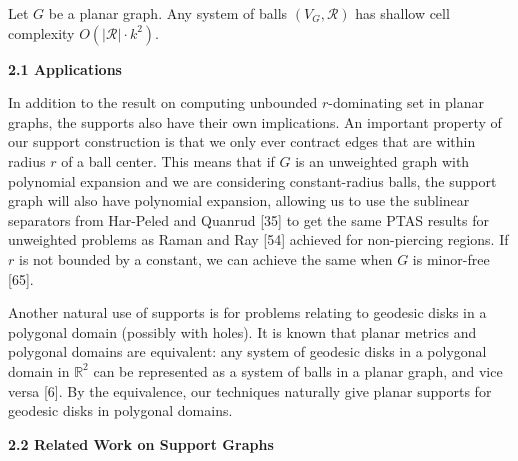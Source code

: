 \documentclass[10pt,a4paper]{article}
\begin{document}
Let $G$ be a planar graph. Any system of balls $(V_{G},\mathcal{R})$ has shallow cell complexity $O(|\mathcal{R}|\cdot k^{2})$.
\par
\par
\par
\par\medskip\noindent\textbf{2.1 Applications}\par
In addition to the result on computing unbounded $r$-dominating set in planar graphs, the supports also have their own implications. An important property of our support construction is that we only ever contract edges that are within radius $r$ of a ball center. This means that if $G$ is an unweighted graph with polynomial expansion and we are considering constant-radius balls, the support graph will also have polynomial expansion, allowing us to use the sublinear separators from Har-Peled and Quanrud [35] to get the same PTAS results for unweighted problems as Raman and Ray [54] achieved for non-piercing regions. If $r$ is not bounded by a constant, we can achieve the same when $G$ is minor-free [65].
\par
\par
Another natural use of supports is for problems relating to geodesic disks in a polygonal domain (possibly with holes). It is known that planar metrics and polygonal domains are equivalent: any system of geodesic disks in a polygonal domain in $\mathbb{R}^{2}$ can be represented as a system of balls in a planar graph, and vice versa [6]. By the equivalence, our techniques naturally give planar supports for geodesic disks in polygonal domains.
\par
\par
\par\medskip\noindent\textbf{2.2 Related Work on Support Graphs}\par
\end{document}
